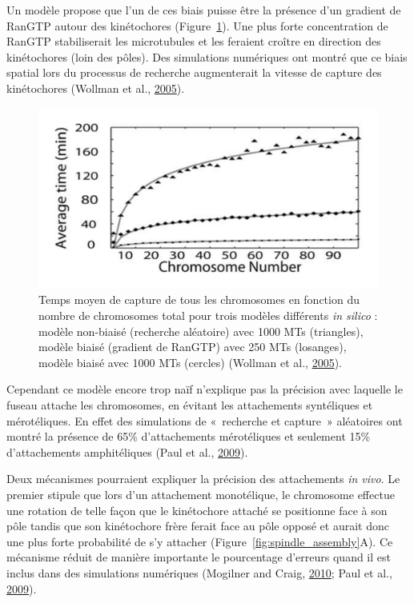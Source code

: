 \documentclass[12pt,a4paper,twoside,openright]{book}
\begin{document}
Un modèle propose que l'un de ces biais puisse être la présence d'un
gradient de RanGTP autour des kinétochores
(Figure~\ref{fig:assembly_time}). Une plus forte concentration de RanGTP
stabiliserait les microtubules et les feraient croître en direction des
kinétochores (loin des pôles). Des simulations numériques ont montré que
ce biais spatial lors du processus de recherche augmenterait la vitesse
de capture des kinétochores (Wollman et al.,
\protect\hyperlink{ref-Wollman2005}{2005}).

\begin{figure}[htbp]
\centering
\includegraphics{figures/intro/assembly_time.png}
\caption[Temps moyen de capture des chromosomes]{\label{fig:assembly_time}Temps
moyen de capture de tous les chromosomes en fonction du nombre de
chromosomes total pour trois modèles différents \emph{in silico} :
modèle non-biaisé (recherche aléatoire) avec 1000 MTs (triangles),
modèle biaisé (gradient de RanGTP) avec 250 MTs (losanges), modèle
biaisé avec 1000 MTs (cercles) (Wollman et al.,
\protect\hyperlink{ref-Wollman2005}{2005}).}
\end{figure}

Cependant ce modèle encore trop naïf n'explique pas la précision avec
laquelle le fuseau attache les chromosomes, en évitant les attachements
syntéliques et mérotéliques. En effet des simulations de «~recherche et
capture~» aléatoires ont montré la présence de 65\% d'attachements
mérotéliques et seulement 15\% d'attachements amphitéliques (Paul et
al., \protect\hyperlink{ref-Paul2009}{2009}).

Deux mécanismes pourraient expliquer la précision des attachements
\emph{in vivo}. Le premier stipule que lors d'un attachement
monotélique, le chromosome effectue une rotation de telle façon que le
kinétochore attaché se positionne face à son pôle tandis que son
kinétochore frère ferait face au pôle opposé et aurait donc une plus
forte probabilité de s'y attacher (Figure~\ref{fig:spindle_assembly}A).
Ce mécanisme réduit de manière importante le pourcentage d'erreurs quand
il est inclus dans des simulations numériques (Mogilner and Craig,
\protect\hyperlink{ref-Mogilner2010}{2010}; Paul et al.,
\protect\hyperlink{ref-Paul2009}{2009}).
\end{document}
